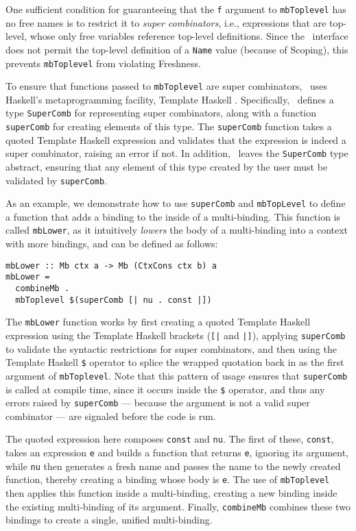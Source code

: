 \documentclass[natbib]{sigplanconf}
\begin{document}
One sufficient condition for guaranteeing that the \lstinline{f}
argument to \lstinline{mbToplevel} has no free names is to restrict it
to \emph{super combinators}, i.e., expressions that are top-level,
whose only free variables reference top-level definitions. Since the
\ourlib\ interface does not permit the top-level definition of a
\lstinline{Name} value (because of Scoping), this prevents
\lstinline{mbToplevel} from violating Freshness.

To ensure that functions passed to \lstinline{mbToplevel} are super
combinators, \ourlib\ uses Haskell's metaprogramming facility,
Template Haskell \cite{sheard-peyton-jones-02}. Specifically, \ourlib\
defines a type \lstinline{SuperComb} for representing super
combinators, along with a function \lstinline{superComb} for
creating elements of this type. The \lstinline{superComb} function
takes a quoted Template Haskell expression and validates that
the expression is indeed a super combinator, raising an error
if not. In addition, \ourlib\ leaves the \lstinline{SuperComb} type
abstract, ensuring that any element of this type created by
the user must be validated by \lstinline{superComb}.

As an example, we demonstrate how to use \lstinline{superComb} and
\lstinline{mbTopLevel} to define a function that adds a binding to the
inside of a multi-binding. This function is called
\lstinline{mbLower}, as it intuitively \emph{lowers} the body of a
multi-binding into a context with more bindings, and can be defined as
follows:
\begin{lstlisting}
mbLower :: Mb ctx a -> Mb (CtxCons ctx b) a
mbLower =
  combineMb .
  mbToplevel $(superComb [| nu . const |])
\end{lstlisting} %
The \lstinline{mbLower} function works by first creating a quoted
Template Haskell expression using the Template Haskell brackets
(\lstinline{[|} and \lstinline{|]}), applying \lstinline{superComb} to
validate the syntactic restrictions for super combinators, and then
using the Template Haskell \lstinline{$} operator to splice the
wrapped quotation back in as the first argument of
\lstinline{mbToplevel}. Note that this pattern of usage ensures that
\lstinline{superComb} is called at compile time, since it occurs
inside the \lstinline{$} operator, and thus any errors raised by
\lstinline{superComb} --- because the argument is not a valid super
combinator --- are signaled before the code is run.

The quoted expression here composes \lstinline{const} and
\lstinline{nu}.  The first of these, \lstinline{const}, takes an
expression \lstinline{e} and builds a function that returns
\lstinline{e}, ignoring its argument, while \lstinline{nu} then
generates a fresh name and passes the name to the newly created
function, thereby creating a binding whose body is \lstinline{e}.  The
use of \lstinline{mbToplevel} then applies this function inside a
multi-binding, creating a new binding inside the existing
multi-binding of its argument. Finally, \lstinline{combineMb} combines
these two bindings to create a single, unified multi-binding.
\end{document}
